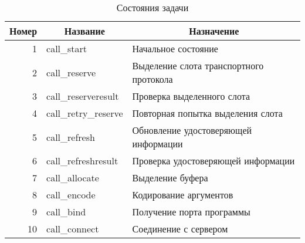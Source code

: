 \begin{table}[htb!]
    \centering
    \begin{threeparttable}
        \caption{Состояния задачи}
        \begin{tabular}{|r|l|l|}
        \hline
        \multicolumn{1}{|c|}{Номер} & \multicolumn{1}{c|}{Название} & \multicolumn{1}{c|}{Назначение}                                                               \\ \hline
        1                           & call\_start                   & Начальное состояние                                                                           \\ \hline
        2                           & call\_reserve                 & Выделение слота транспортного протокола                                                       \\ \hline
        3                           & call\_reserveresult           & Проверка выделенного слота                                                                    \\ \hline
        4                           & call\_retry\_reserve          & Повторная попытка выделения слота                                                             \\ \hline
        5                           & call\_refresh                 & Обновление удостоверяющей информации                                                          \\ \hline
        6                           & call\_refreshresult           & Проверка удостоверяющей информации                                                            \\ \hline
        7                           & call\_allocate                & Выделение буфера                                                                              \\ \hline
        8                           & call\_encode                  & Кодирование аргументов                                                                        \\ \hline
        9                           & call\_bind                    & Получение порта программы                                                                     \\ \hline
        10                          & call\_connect                 & Соединение с сервером                                                                         \\ \hline

\end{tabular}
\end{threeparttable}
\end{table}
